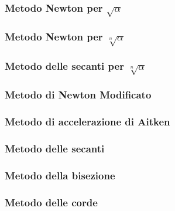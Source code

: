 \label{functcap2}
\subsubsection{Metodo Newton per $\sqrt{\alpha}$}

\subsubsection{Metodo Newton per $\sqrt[n]{\alpha}$}

\subsubsection{Metodo delle secanti per $\sqrt[n]{\alpha}$}

\subsubsection{Metodo di Newton Modificato}

\subsubsection{Metodo di accelerazione di Aitken}

\subsubsection{Metodo delle secanti}

\subsubsection{Metodo della bisezione}

\subsubsection{Metodo delle corde}
